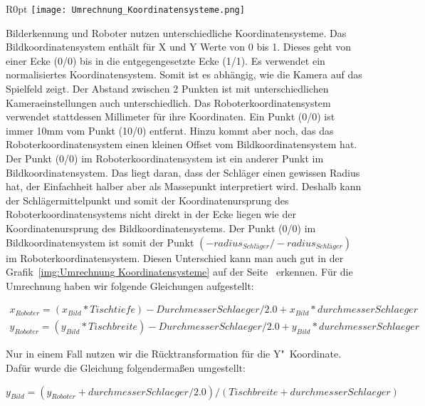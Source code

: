 \begin{wrapfigure}{R}{0pt}
	\vspace{-15pt}
	\texttt{[image: Umrechnung\_Koordinatensysteme.png]}
	\vspace{-15pt}
	\caption{ Veranschaulichung der Koordinatensystemunterschiede}
	\vspace{-15pt}
	\label{img:Umrechnung Koordinatensysteme}
\end{wrapfigure}
Bilderkennung und Roboter nutzen unterschiedliche Koordinatensysteme. Das Bildkoordinatensystem enthält für X und Y Werte von 0 bis 1. Dieses geht von einer Ecke (0/0) bis in die entgegengesetzte Ecke (1/1). Es verwendet ein normalisiertes Koordinatensystem. Somit ist es abhängig, wie die Kamera auf das Spielfeld zeigt. Der Abstand zwischen 2 Punkten ist mit unterschiedlichen Kameraeinstellungen auch unterschiedlich. Das Roboterkoordinatensystem verwendet stattdessen Millimeter für ihre Koordinaten. Ein Punkt (0/0) ist immer 10mm vom Punkt (10/0) entfernt. Hinzu kommt aber noch, das das Roboterkoordinatensystem einen kleinen Offset vom Bildkoordinatensystem hat. Der Punkt (0/0) im Roboterkoordinatensystem ist ein anderer Punkt im Bildkoordinatensystem. Das liegt daran, dass der Schläger einen gewissen Radius hat, der Einfachheit halber aber als Massepunkt interpretiert wird. Deshalb kann der Schlägermittelpunkt und somit der Koordinatenursprung des Roboterkoordinatensystems nicht direkt in der Ecke liegen wie der Koordinatenursprung des Bildkoordinatensystems.
Der Punkt (0/0) im Bildkoordinatensystem ist somit der Punkt $(-radius_{Schläger}/-radius_{Schläger})$ im Roboterkoordinatensystem. Diesen Unterschied kann man auch gut in der Grafik~\ref{img:Umrechnung Koordinatensysteme} auf der Seite~\pageref{img:Umrechnung Koordinatensysteme} erkennen. Für die Umrechnung haben wir folgende Gleichungen aufgestellt:

$
\begin{array}{c}
x_{Roboter} = (x_{Bild} * Tischtiefe) - Durchmesser Schlaeger / 2.0 + x_{Bild} * durchmesserSchlaeger \\
y_{Roboter} = (y_{Bild} * Tischbreite) - Durchmesser Schlaeger / 2.0 + y_{Bild} * durchmesserSchlaeger
\end{array}
$

Nur in einem Fall nutzen wir die Rücktransformation für die Y"~Koordinate. Dafür wurde die Gleichung folgendermaßen umgestellt:

$y_{Bild} = (y_{Roboter} + durchmesserSchlaeger / 2.0) / (Tischbreite +  durchmesserSchlaeger)$ 